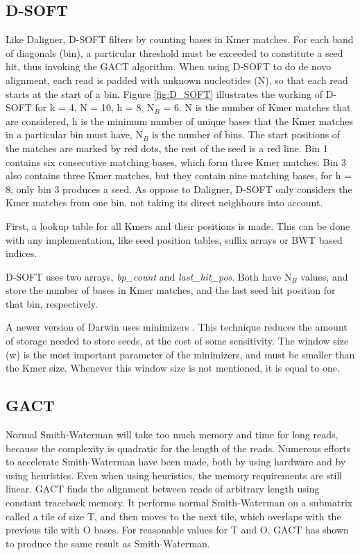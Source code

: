 \documentclass[../thesis.tex]{subfiles}
\begin{document}
\subsection{D-SOFT}
Like Daligner, D-SOFT filters by counting bases in Kmer matches.
For each band of diagonals (bin), a particular threshold must be exceeded to constitute a seed hit, thus invoking the GACT algorithm.
When using D-SOFT to do de novo alignment, each read is padded with unknown nucleotides (N), so that each read starts at the start of a bin.
Figure \ref{fig:D_SOFT} illustrates the working of D-SOFT for k = 4, N = 10, h = 8, N$_{B}$ = 6.
N is the number of Kmer matches that are considered, h is the minimum number of unique bases that the Kmer matches in a particular bin must have, N$_{B}$ is the number of bins.
The start positions of the matches are marked by red dots, the rest of the seed is a red line.
Bin 1 contains six consecutive matching bases, which form three Kmer matches.
Bin 3 also contains three Kmer matches, but they contain nine matching bases, for h = 8, only bin 3 produces a seed.
As oppose to Daligner, D-SOFT only considers the Kmer matches from one bin, not taking its direct neighbours into account.


First, a lookup table for all Kmers and their positions is made.
This can be done with any implementation, like seed position tables, suffix arrays \cite{SA} or BWT \cite{BWT} based indices.

D-SOFT uses two arrays, \textit{bp\_count} and \textit{last\_hit\_pos}.
Both have N$_{B}$ values, and store the number of bases in Kmer matches, and the last seed hit position for that bin, respectively.

A newer version of Darwin uses minimizers \cite{minimizers}.
This technique reduces the amount of storage needed to store seeds, at the cost of some sensitivity.
The window size (w) is the most important parameter of the minimizers, and must be smaller than the Kmer size.
Whenever this window size is not mentioned, it is equal to one.

\subsection{GACT}
Normal Smith-Waterman will take too much memory and time for long reads, because the complexity is quadratic for the length of the reads.
Numerous efforts to accelerate Smith-Waterman have been made, both by using hardware and by using heuristics.
Even when using heuristics, the memory requirements are still linear.
GACT finds the alignment between reads of arbitrary length using constant traceback memory.
It performs normal Smith-Waterman on a submatrix called a tile of size T, and then moves to the next tile, which overlaps with the previous tile with O bases.
For reasonable values for T and O, GACT has shown to produce the same result as Smith-Waterman.
\end{document}
